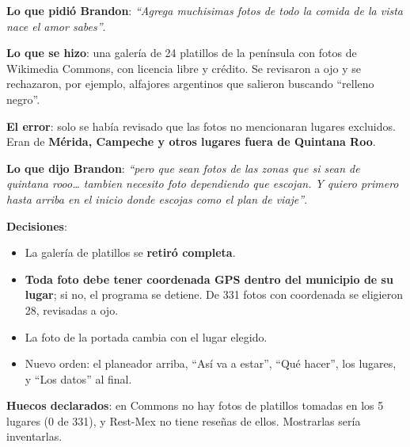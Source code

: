 \begin{opciones}
\textbf{Lo que pidió Brandon}: \emph{``Agrega muchisimas fotos de todo la comida de la vista nace el amor sabes''}.

\textbf{Lo que se hizo}: una galería de 24 platillos de la península con fotos de Wikimedia Commons, con licencia libre y
crédito. Se revisaron a ojo y se rechazaron, por ejemplo, alfajores argentinos que salieron buscando ``relleno negro''.

\textbf{El error}: solo se había revisado que las fotos no mencionaran lugares excluidos. Eran de \textbf{Mérida, Campeche y
otros lugares fuera de Quintana Roo}.
\end{opciones}

\begin{opciones}
\textbf{Lo que dijo Brandon}: \emph{``pero que sean fotos de las zonas que si sean de quintana rooo\dots{} tambien necesito foto
dependiendo que escojan. Y quiero primero hasta arriba en el inicio donde escojas como el plan de viaje''}.

\textbf{Decisiones}:
\begin{itemize}
\item La galería de platillos se \textbf{retiró completa}.
\item \textbf{Toda foto debe tener coordenada GPS dentro del municipio de su lugar}; si no, el programa se detiene. De 331 fotos
  con coordenada se eligieron 28, revisadas a ojo.
\item La foto de la portada cambia con el lugar elegido.
\item Nuevo orden: el planeador arriba, ``Así va a estar'', ``Qué hacer'', los lugares, y ``Los datos'' al final.
\end{itemize}
\textbf{Huecos declarados}: en Commons no hay fotos de platillos tomadas en los 5 lugares (0 de 331), y Rest-Mex no tiene
reseñas de ellos. Mostrarlas sería inventarlas.
\end{opciones}

